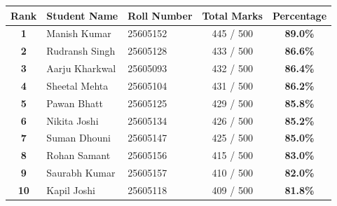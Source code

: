 \documentclass[11pt, a4paper]{article}
\begin{document}
\begin{tcolorbox}[enhanced, colback=cardbg, colframe=cardbg, arc=4mm, boxrule=0pt]
    \centering
    \renewcommand{\arraystretch}{1.5}
    \begin{tabularx}{\textwidth}{c X l c c}
        \toprule
        \textbf{\textcolor{neoncyan}{Rank}} & \textbf{\textcolor{textdim}{Student Name}} & \textbf{\textcolor{textdim}{Roll Number}} & \textbf{\textcolor{textdim}{Total Marks}} & \textbf{\textcolor{neoncyan}{Percentage}} \\
        \midrule
        \textbf{1}  & Manish Kumar     & 25605152 & 445 / 500 & \textbf{\textcolor{neonteal}{89.0\%}} \\
        \textbf{2}  & Rudransh Singh   & 25605128 & 433 / 500 & \textbf{86.6\%} \\
        \textbf{3}  & Aarju Kharkwal   & 25605093 & 432 / 500 & \textbf{86.4\%} \\
        \textbf{4}  & Sheetal Mehta    & 25605104 & 431 / 500 & \textbf{86.2\%} \\
        \textbf{5}  & Pawan Bhatt      & 25605125 & 429 / 500 & \textbf{85.8\%} \\
        \textbf{6}  & Nikita Joshi     & 25605134 & 426 / 500 & \textbf{85.2\%} \\
        \textbf{7}  & Suman Dhouni     & 25605147 & 425 / 500 & \textbf{85.0\%} \\
        \textbf{8}  & Rohan Samant     & 25605156 & 415 / 500 & \textbf{83.0\%} \\
        \textbf{9}  & Saurabh Kumar    & 25605157 & 410 / 500 & \textbf{82.0\%} \\
        \textbf{10} & Kapil Joshi      & 25605118 & 409 / 500 & \textbf{81.8\%} \\
        \bottomrule
    \end{tabularx}
\end{tcolorbox}

\vspace{0.5cm}
\end{document}
